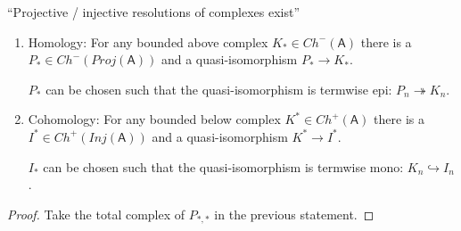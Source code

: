 \documentclass[fontsize=11pt,fleqn,a4paper]{scrartcl}
\begin{document}
\begin{lemma}
\enquote{Projective / injective resolutions of complexes exist}

\begin{multicols}{2}
\begin{enumerate}
\item Homology: For any bounded above complex $K_\ast\in Ch^-(\mathsf{A})$ there is a $P_\ast \in Ch^-(Proj(\mathsf{A}))$ and a quasi-isomorphism $P_\ast \to K_\ast$.

$P_\ast$ can be chosen such that the quasi-isomorphism is termwise epi: $P_n\twoheadrightarrow K_n$.

\item Cohomology: For any bounded below complex $K^\ast\in Ch^+(\mathsf{A})$ there is a $I^\ast \in Ch^+(Inj(\mathsf{A}))$ and a quasi-isomorphism $K^\ast \to I^\ast$.

$I_\ast$ can be chosen such that the quasi-isomorphism is termwise mono: $K_n \hookrightarrow I_n$.
\end{enumerate}
\end{multicols}
\end{lemma}
\begin{proof}
Take the total complex of $P_{\ast,\ast}$ in the previous statement.
\end{proof}
\end{document}
